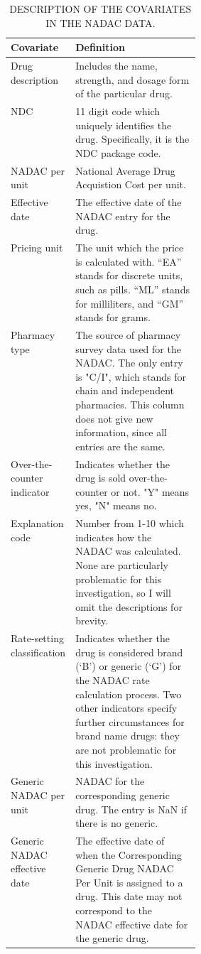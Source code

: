 \documentclass[12pt]{article}
\begin{document}
\begin{table}
\centering
\caption{\MakeUppercase{Description of the covariates in the NADAC data.}}
\label{table:table11}
\begin{singlespace}
\begin{minipage}{0.95\linewidth}
\small
\begin{tabularx}{\linewidth}{@{}>{\raggedright\arraybackslash}p{0.31\linewidth}X@{}}

\toprule
Covariate & Definition \tabularnewline
\midrule

Drug description & Includes the name, strength, and dosage form of the particular drug. \tabularnewline \addlinespace[3pt]

NDC & 11 digit code which uniquely identifies the drug. Specifically, it is the NDC package code. \tabularnewline \addlinespace[3pt]

NADAC per unit & National Average Drug Acquistion Cost per unit. \tabularnewline \addlinespace[3pt]

Effective date & The effective date of the NADAC entry for the drug. \tabularnewline \addlinespace[3pt]

Pricing unit & The unit which the price is calculated with. “EA” stands for discrete units, such as pills. “ML” stands for milliliters, and “GM” stands for grams. \tabularnewline \addlinespace[3pt]

Pharmacy type & The source of pharmacy survey data used for the NADAC. The only entry is "C/I", which stands for chain and independent pharmacies. This column does not give new information, since all entries are the same. \tabularnewline \addlinespace[3pt]

Over-the-counter indicator & Indicates whether the drug is sold over-the-counter or not. "Y" means yes, "N" means no. \tabularnewline \addlinespace[3pt]

Explanation code & Number from 1-10 which indicates how the NADAC was calculated. None are particularly problematic for this investigation, so I will omit the descriptions for brevity. \tabularnewline \addlinespace[3pt]

Rate-setting classification & Indicates whether the drug is considered brand (‘B’) or generic (‘G’) for the NADAC rate calculation process. Two other indicators specify further circumstances for brand name drugs: they are not problematic for this investigation. \tabularnewline \addlinespace[3pt]

Generic NADAC per unit & NADAC for the corresponding generic drug. The entry is NaN if there is no generic. \tabularnewline \addlinespace[3pt]

Generic NADAC effective date & The effective date of when the Corresponding Generic Drug NADAC Per Unit is assigned to a drug. This date may not correspond to the NADAC effective date for the generic drug. \tabularnewline

\bottomrule
\end{tabularx}
\end{minipage}
\end{singlespace}
\end{table}
\end{document}
